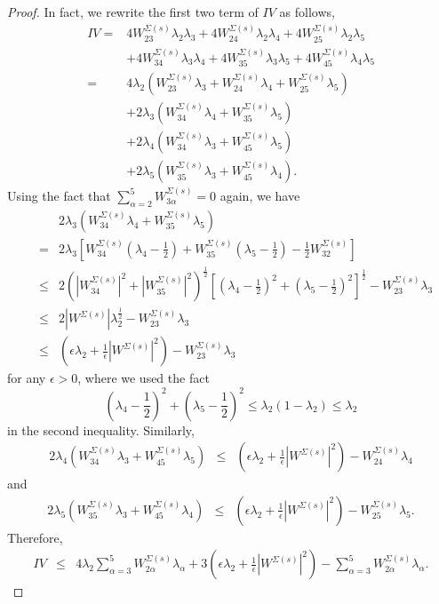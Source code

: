 \documentclass[12pt]{amsart}
\newcommand{\ban}{\begin{eqnarray*}}
\newcommand{\ean}{\end{eqnarray*}}
\begin{document}
\begin{proof}
		In fact, we rewrite the first two term of $IV$ as follows,
		\begin{equation*}
		\begin{aligned}
		IV
		=&4W^{\Sigma(s)}_{23}\lambda_{2}\lambda_{3}+4W^{\Sigma(s)}_{24}\lambda_{2}\lambda_{4}+4W^{\Sigma(s)}_{25}\lambda_{2}\lambda_{5}\\
		&+4W^{\Sigma(s)}_{34}\lambda_{3}\lambda_{4}+4W^{\Sigma(s)}_{35}\lambda_{3}\lambda_{5}+4W^{\Sigma(s)}_{45}\lambda_{4}\lambda_{5}\\
		=&4\lambda_{2}(W^{\Sigma(s)}_{23}\lambda_{3}+W^{\Sigma(s)}_{24}\lambda_{4}+W^{\Sigma(s)}_{25}\lambda_{5})\\
		&+2\lambda_3(W^{\Sigma(s)}_{34}\lambda_{4}+W^{\Sigma(s)}_{35}\lambda_{5})\\
		&+2\lambda_4(W^{\Sigma(s)}_{34}\lambda_{3}+W^{\Sigma(s)}_{45}\lambda_{5})\\
		&+2\lambda_5(W^{\Sigma(s)}_{35}\lambda_{3}+W^{\Sigma(s)}_{45}\lambda_{4}).
		\end{aligned}
		\end{equation*}
		Using the fact that
		$\sum_{\alpha=2}^5W^{\Sigma(s)}_{3\alpha}=0$ again, we have
		\ban
		&&2\lambda_3(W^{\Sigma(s)}_{34}\lambda_{4}+W^{\Sigma(s)}_{35}\lambda_{5})\\
		 &=&2\lambda_3\left[W^{\Sigma(s)}_{34}(\lambda_{4}-\frac{1}{2})+W^{\Sigma(s)}_{35}(\lambda_{5}-\frac{1}{2})-\frac{1}{2}W^{\Sigma(s)}_{32}\right] \\
		 &\leq&2(|W^{\Sigma(s)}_{34}|^2+|W^{\Sigma(s)}_{35}|^2)^\frac{1}{2}\left[(\lambda_{4}-\frac{1}{2})^2+(\lambda_{5}-\frac{1}{2})^2\right]^\frac{1}{2}-W^{\Sigma(s)}_{23}\lambda_{3}\\
		&\leq&2|W^{\Sigma(s)}|\lambda_2^{\frac{1}{2}}-W^{\Sigma(s)}_{23}\lambda_{3}\\
		&\leq&\left( \epsilon\lambda_2+\frac{1}{\epsilon}|W^{\Sigma(s)}|^2\right)-W^{\Sigma(s)}_{23}\lambda_{3}
		\ean
		for any $\epsilon>0$, where we used the fact $$(\lambda_{4}-\frac{1}{2})^2+(\lambda_{5}-\frac{1}{2})^2 \leq\lambda_2(1-\lambda_2)\leq\lambda_2$$  in the second inequality.
		Similarly,
		\ban
		2\lambda_4(W^{\Sigma(s)}_{34}\lambda_{3}+W^{\Sigma(s)}_{45}\lambda_{5})&\leq&\left( \epsilon\lambda_2+\frac{1}{\epsilon}|W^{\Sigma(s)}|^2\right)-W^{\Sigma(s)}_{24}\lambda_{4}
		\ean
		and
		\ban
		2\lambda_5(W^{\Sigma(s)}_{35}\lambda_{3}+W^{\Sigma(s)}_{45}\lambda_{4})&\leq&\left( \epsilon\lambda_2+\frac{1}{\epsilon}|W^{\Sigma(s)}|^2\right)-W^{\Sigma(s)}_{25}\lambda_{5}.
		\ean
		Therefore,
		\ban
		IV&\leq&4\lambda_{2}\sum_{\alpha=3}^5 W^{\Sigma(s)}_{2\alpha}\lambda_{\alpha}+3\left( \epsilon\lambda_2+\frac{1}{\epsilon}|W^{\Sigma(s)}|^2\right)-\sum_{\alpha=3}^5 W^{\Sigma(s)}_{2\alpha}\lambda_{\alpha}.
		\ean
		

\end{proof}
\end{document}
